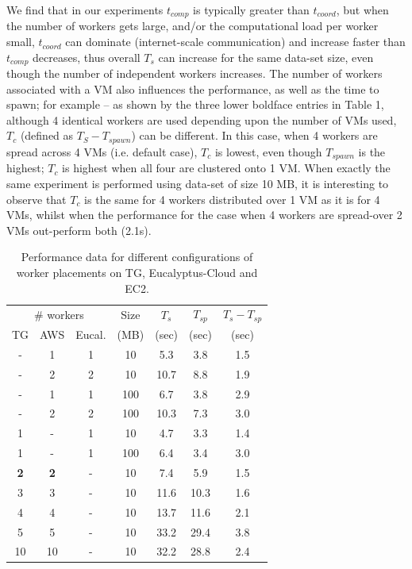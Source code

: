 \documentclass[3p,twocolumn]{elsarticle}
\begin{document}
We find that in our experiments $t_{comp}$ is typically greater than
$t_{coord}$, but when the number of workers gets large, and/or the
computational load per worker small, $t_{coord}$ can dominate
(internet-scale communication) and increase faster than $t_{comp}$
decreases, thus overall $T_s$ can increase for the same data-set size,
even though the number of independent workers increases.  The number
of workers associated with a VM also influences the performance, as
well as the time to spawn; for example -- as shown by the three lower
boldface entries in Table 1, although 4 identical workers are used
depending upon the number of VMs used, $T_c$ (defined as $T_S -
T_{spawn} $) can be different.  In this case, when 4 workers are
spread across 4 VMs (i.e. default case), $T_c$ is lowest, even though
$T_{spawn}$ is the highest; $T_c$ is highest when all four are
clustered onto 1 VM. When exactly the same experiment is performed
using data-set of size 10 MB, it is interesting to observe that $T_c$
is the same for 4 workers distributed over 1 VM as it is for 4 VMs,
whilst when the performance for the case when  4 workers are
spread-over 2 VMs out-perform both (2.1s).

\begin{table}[h!]
  \footnotesize
  \begin{tabular}{ccccccc}
    \hline
    \multicolumn{3}{c}{\# workers}  &  Size   &  $T_s$  & $T_{sp}$ & $T_s - T_{sp}$\\   
    TG &  AWS & Eucal. &  (MB)  & (sec) & (sec) & (sec) \\
    \hline
    - & 1 & 1 & 10   & 5.3 & 3.8 & 1.5\\
    - & 2 & 2 & 10   & 10.7 & 8.8 & 1.9 \\
    - & 1 & 1 & 100  & 6.7 & 3.8 & 2.9\\
    - & 2 & 2 & 100  & 10.3 & 7.3 & 3.0\\
    \hline 
    1 & - & 1 & 10   & 4.7 & 3.3 & 1.4\\
    1 & - & 1 & 100  & 6.4 & 3.4 & 3.0\\
    \hline 
    {\bf 2} &   {\bf 2} & - & 10 & 7.4 & 5.9 & 1.5 \\
    3 & 3 & - & 10 & 11.6 & 10.3 & 1.6 \\
    4 & 4 & - & 10 & 13.7 & 11.6 & 2.1 \\
    5 & 5 & - & 10 & 33.2 & 29.4 & 3.8 \\ 
    10 & 10 & - & 10 & 32.2 & 28.8 & 2.4 \\
    \hline
     \hline 
  \end{tabular}
  \caption{Performance data for different configurations of worker
  placements on TG, Eucalyptus-Cloud and EC2. \uppp
  \label{tab:1b}}
\end{table}
\end{document}
